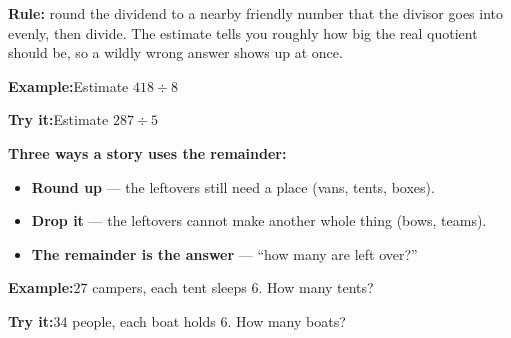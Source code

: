 \documentclass[12pt]{article}
\begin{document}

\begin{formulabox}
\textbf{Rule:} round the dividend to a nearby friendly number that the divisor goes
into evenly, then divide. The estimate tells you roughly how big the real quotient
should be, so a wildly wrong answer shows up at once.
\end{formulabox}

\begin{examplebox}
\textbf{Example:}\quad Estimate $418 \div 8$
\end{examplebox}

\begin{tryitbox}
\textbf{Try it:}\quad Estimate $287 \div 5$\\[2pt]
\end{tryitbox}


\begin{formulabox}
\textbf{Three ways a story uses the remainder:}
\begin{itemize}[leftmargin=1cm, itemsep=1pt, topsep=2pt]
  \item \textbf{Round up} --- the leftovers still need a place (vans, tents, boxes).
  \item \textbf{Drop it} --- the leftovers cannot make another whole thing (bows, teams).
  \item \textbf{The remainder is the answer} --- ``how many are left over?''
\end{itemize}
\end{formulabox}

\begin{examplebox}
\textbf{Example:}\quad $27$ campers, each tent sleeps $6$. How many tents?
\end{examplebox}

\begin{tryitbox}
\textbf{Try it:}\quad $34$ people, each boat holds $6$. How many boats?\\[2pt]
\end{tryitbox}
\end{document}
